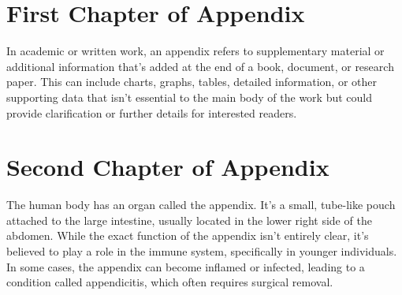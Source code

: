 \begin{appendices}



\chapter{First Chapter of Appendix}

In academic or written work, an appendix refers to supplementary material or additional information that's added at the end of a book, document, or research paper. This can include charts, graphs, tables, detailed information, or other supporting data that isn't essential to the main body of the work but could provide clarification or further details for interested readers.


\chapter{Second Chapter of Appendix}

The human body has an organ called the appendix. It's a small, tube-like pouch attached to the large intestine, usually located in the lower right side of the abdomen. While the exact function of the appendix isn't entirely clear, it's believed to play a role in the immune system, specifically in younger individuals. In some cases, the appendix can become inflamed or infected, leading to a condition called appendicitis, which often requires surgical removal. 

\end{appendices}

